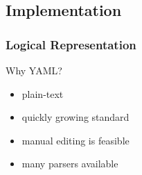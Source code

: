\documentclass{beamer}
\begin{document}
\subsection{Implementation}
\begin{frame}
  \frametitle{Logical Representation}
  \begin{block}{Why YAML?}
    \begin{itemize}[<+->]
    \item plain-text
    \item quickly growing standard
    \item manual editing is feasible
    \item many parsers available
    \end{itemize}
  \end{block}
\end{frame}
\end{document}
